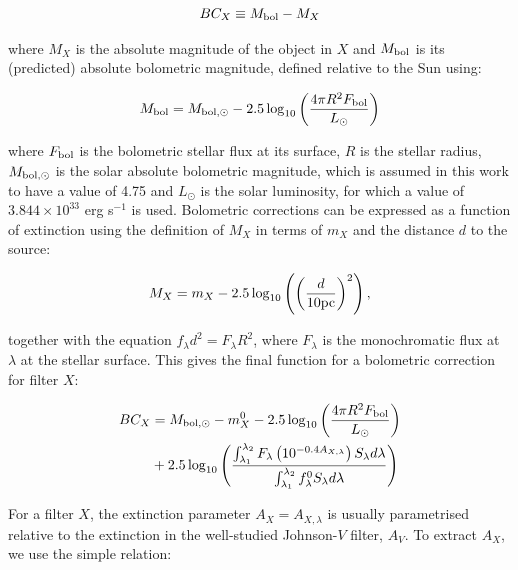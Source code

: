 \documentclass[12pt, a4paper]{report}
\begin{document}
\begin{equation}
BC_{X} \equiv M_{\textnormal{bol}} - M_{X}
\label{BC_def}
\end{equation}

where $M_{X}$ is the absolute magnitude of the object in $X$ and $M_{\textnormal{bol}}$ is its (predicted) absolute bolometric magnitude, defined relative to the Sun using:

\begin{equation}
M_{\textnormal{bol}} = M_{\textnormal{bol},\odot} - 2.5 \log_{10} \left( \frac{4\pi R^{2}F_{\textnormal{bol}}}{L_{\odot}} \right)
\label{mbol_sun}
\end{equation}

where  $F_{\textnormal{bol}}$ is the bolometric stellar flux at its surface, $R$ is the stellar radius, $M_{\textnormal{bol},\odot}$ is the solar absolute bolometric magnitude, which is assumed in this work to have a value of 4.75 and $L_{\odot}$ is the solar luminosity, for which a value of $3.844 \times 10^{33}$ erg s$^{-1}$ is used. Bolometric corrections can be expressed as a function of extinction using the definition of $M_{X}$ in terms of $m_{X}$ and the distance $d$ to the source:

\begin{equation}
M_{X} = m_{X} - 2.5 \log_{10}\left( \left( \frac{d}{10 \textnormal{pc}} \right)^{2} \right),
\label{abs_mag_def}
\end{equation}

together with the equation $f_{\lambda}d^{2}=F_{\lambda}R^{2}$, where $F_{\lambda}$ is the monochromatic flux at $\lambda$ at the stellar surface. This gives the final function for a bolometric correction for filter $X$:

\begin{align}
\begin{split}
BC_{X} &= M_{\textnormal{bol},\odot} - m_{X}^{0} - 2.5 \log_{10} \left( \frac{4\pi R^{2}F_{\textnormal{bol}}}{L_{\odot}} \right) \\
&+ 2.5 \log_{10} \left( \frac{\int_{\lambda_{1}}^{\lambda_{2}} F_{\lambda} \left( 10^{-0.4 A_{X,\lambda}} \right) S_{\lambda} d\lambda}{\int_{\lambda_{1}}^{\lambda_{2}} f_{\lambda}^{0} S_{\lambda} d\lambda} \right)
\label{BC_extinc}
\end{split}
\end{align}

For a filter $X$, the extinction parameter $A_{X} = A_{X,\lambda}$ is usually parametrised relative to the extinction in the well-studied Johnson-$V$ filter, $A_{V}$. To extract $A_{X}$, we use the simple relation:
\end{document}
